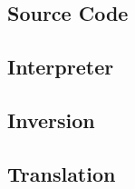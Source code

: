 \begin{appendices}


\makeatletter
{}

\makeatother
  \chapter{Source Code}
  \section{Interpreter}
  \section{Inversion}
  \section{Translation}

\end{appendices}
